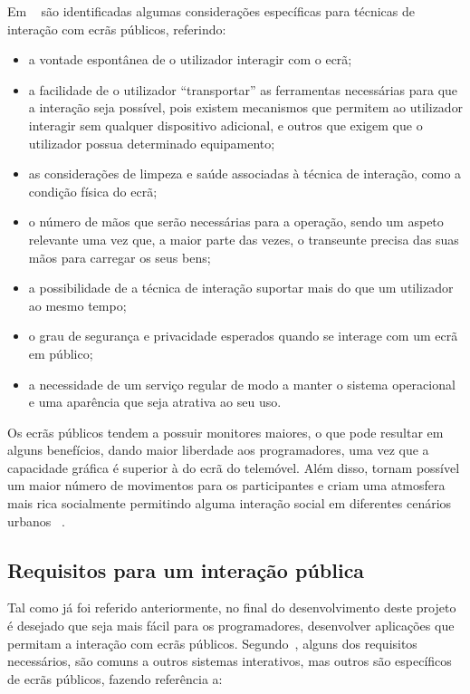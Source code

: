 Em ~\cite{Ballagas} são identificadas algumas considerações específicas para técnicas de interação com ecrãs públicos, referindo: 
	\begin{itemize}
	\item a vontade espontânea de o utilizador interagir com o ecrã;

	\item a facilidade de o utilizador ``transportar'' as ferramentas necessárias para que a interação seja possível, pois existem mecanismos que permitem ao utilizador interagir sem qualquer dispositivo adicional, e outros que exigem que o utilizador possua determinado equipamento;

	\item as considerações de limpeza e saúde associadas à técnica de interação, como a condição física do ecrã;

	\item o número de mãos que serão necessárias para a operação, sendo um aspeto relevante uma vez que, a maior parte das vezes, o transeunte precisa das suas mãos para carregar os seus bens;

	\item a possibilidade de a técnica de interação suportar mais do que um utilizador ao mesmo tempo;

	\item o grau de segurança e privacidade esperados quando se interage com um ecrã em público;

	\item a necessidade de um serviço regular de modo a manter o sistema operacional e uma aparência que seja atrativa ao seu uso.
	\end{itemize}

Os ecrãs públicos tendem a possuir monitores maiores, o que pode resultar em alguns benefícios, dando maior liberdade aos programadores, uma vez que a capacidade gráfica é superior à do ecrã do telemóvel. Além disso, tornam possível um maior número de movimentos para os participantes e criam uma atmosfera mais rica socialmente permitindo alguma interação social em diferentes cenários urbanos ~\cite{Vajk2008b}.

\subsection{Requisitos para um interação pública} \label{batik} 

Tal como já foi referido anteriormente, no final do desenvolvimento deste projeto é desejado que seja mais fácil para os programadores, desenvolver aplicações que permitam a interação com ecrãs públicos. Segundo~\cite{Cardoso2012g}, alguns dos requisitos necessários, são comuns a outros sistemas interativos, mas outros são específicos de ecrãs públicos, fazendo referência a:


